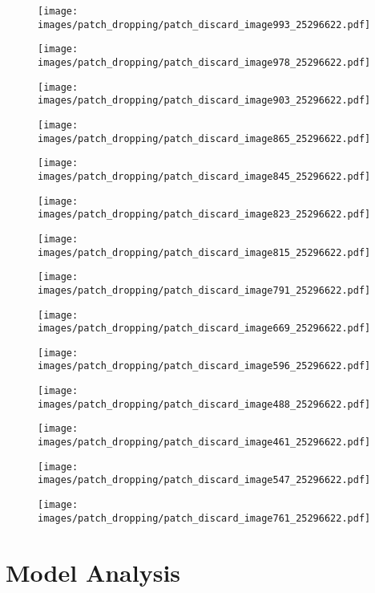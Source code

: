 \documentclass{article}
\begin{document}
\begin{figure}[h]
\centering
\texttt{[image: images/patch\_dropping/patch\_discard\_image993\_25296622.pdf]}

\centering
\texttt{[image: images/patch\_dropping/patch\_discard\_image978\_25296622.pdf]}

\centering
\texttt{[image: images/patch\_dropping/patch\_discard\_image903\_25296622.pdf]}

\centering
\texttt{[image: images/patch\_dropping/patch\_discard\_image865\_25296622.pdf]}

\centering
\texttt{[image: images/patch\_dropping/patch\_discard\_image845\_25296622.pdf]}

\centering
\texttt{[image: images/patch\_dropping/patch\_discard\_image823\_25296622.pdf]}

\centering
\texttt{[image: images/patch\_dropping/patch\_discard\_image815\_25296622.pdf]}

\end{figure}

\begin{figure}[h]
\centering
\texttt{[image: images/patch\_dropping/patch\_discard\_image791\_25296622.pdf]}

\centering
\texttt{[image: images/patch\_dropping/patch\_discard\_image669\_25296622.pdf]}

\centering
\texttt{[image: images/patch\_dropping/patch\_discard\_image596\_25296622.pdf]}

\centering
\texttt{[image: images/patch\_dropping/patch\_discard\_image488\_25296622.pdf]}

\centering
\texttt{[image: images/patch\_dropping/patch\_discard\_image461\_25296622.pdf]}

\centering
\texttt{[image: images/patch\_dropping/patch\_discard\_image547\_25296622.pdf]}

\centering
\texttt{[image: images/patch\_dropping/patch\_discard\_image761\_25296622.pdf]}

\end{figure} \clearpage
\section{Model Analysis}
\label{app_analysis}
\end{document}
